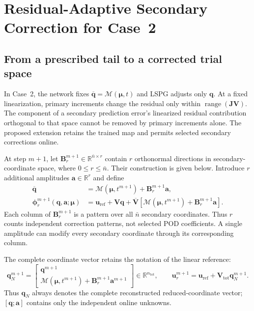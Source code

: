 \documentclass[11pt]{article}
\newcommand{\q}{\mathbf q}
\newcommand{\qbar}{\overline{\mathbf q}}
\newcommand{\uvec}{\mathbf u}
\newcommand{\mub}{\bm\mu}
\begin{document}
\section{Residual-Adaptive Secondary Correction for Case~2}
\label{sec:adaptive-case2}
\subsection{From a prescribed tail to a corrected trial space}
In Case~2, the network fixes $\qbar=\mathcal M(\mub,t)$ and LSPG adjusts
only $\q$.  At a fixed linearization, primary increments change the residual
only within $\operatorname{range}(\mathbf J\mathbf V)$.  The component of a
secondary prediction error's linearized residual contribution orthogonal to
that space cannot be removed by primary increments alone.  The proposed extension retains
the trained map and permits selected secondary corrections online.

At step $m+1$, let $\mathbf B_r^{m+1}\in\mathbb R^{\bar n\times r}$
contain $r$ orthonormal directions in secondary-coordinate space, where
$0\leq r\leq\bar n$.  Their construction is given below.  Introduce
$r$ additional amplitudes $\mathbf a\in\mathbb R^r$ and define
\begin{equation}
\begin{aligned}
\qbar&=\mathcal M(\mub,t^{m+1})+\mathbf B_r^{m+1}\mathbf a,\\
\boldsymbol\phi_r^{m+1}(\q,\mathbf a;\mub)
&=\uvec_{\mathrm{ref}}+\mathbf V\q+
\overline{\mathbf V}
\left[\mathcal M(\mub,t^{m+1})+\mathbf B_r^{m+1}\mathbf a\right].
\end{aligned}
\label{eq:adaptive-trial}
\end{equation}
Each column of $\mathbf B_r^{m+1}$ is a pattern over all $\bar n$
secondary coordinates.  Thus $r$ counts independent correction patterns,
not selected POD coefficients.  A single amplitude can modify every
secondary coordinate through its corresponding column.

The complete coordinate vector retains the notation of the linear
reference:
\begin{equation}
\q_N^{m+1}=\begin{bmatrix}
\q^{m+1}\\
\mathcal M(\mub,t^{m+1})+\mathbf B_r^{m+1}\mathbf a^{m+1}
\end{bmatrix}\in\mathbb R^{n_{\mathrm{tot}}},\qquad
\uvec_r^{m+1}=\uvec_{\mathrm{ref}}+\mathbf V_{\mathrm{tot}}\q_N^{m+1}.
\label{eq:adaptive-complete-coordinates}
\end{equation}
Thus $\q_N$ always denotes the complete reconstructed reduced-coordinate
vector; $[\q;\mathbf a]$ contains only the independent online unknowns.
\end{document}

